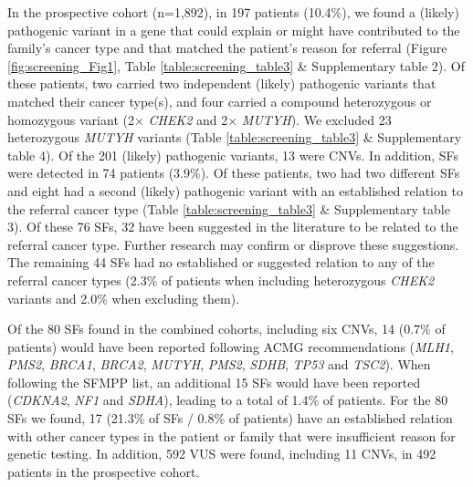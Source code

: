 In the prospective cohort (n=1,892), in 197 patients (10.4\%), we found a (likely) pathogenic variant in a gene that could explain or might have contributed to the family’s cancer type and that matched the patient’s reason for referral (Figure \ref{fig:screening_Fig1}, Table \ref{table:screening_table3} \& Supplementary table 2). %
Of these patients, two carried two independent (likely) pathogenic variants that matched their cancer type(s), and four carried a compound heterozygous or homozygous variant (2$\times$  \textsl{CHEK2} and 2$\times$  \textsl{MUTYH}). 
We excluded 23 heterozygous \textsl{MUTYH} variants (Table \ref{table:screening_table3} \& Supplementary table 4). %
Of the 201 (likely) pathogenic variants, 13 were CNVs. In addition, SFs were detected in 74 patients (3.9\%). 
Of these patients, two had two different SFs and eight had a second (likely) pathogenic variant with an established relation to the referral cancer type (Table \ref{table:screening_table3} \& Supplementary table 3). 
Of these 76 SFs, 32 have been suggested in the literature to be related to the referral cancer type. 
Further research may confirm or disprove these suggestions. The remaining 44 SFs had no established or suggested relation to any of the referral cancer types (2.3\% of patients when including heterozygous \textsl{CHEK2} variants and 2.0\% when excluding them). 

Of the 80 SFs found in the combined cohorts, including six CNVs, 14 (0.7\% of patients) would have been reported following ACMG recommendations (\textsl{MLH1}, \textsl{PMS2}, \textsl{BRCA1}, \textsl{BRCA2}, \textsl{MUTYH}, \textsl{PMS2}, \textsl{SDHB}, \textsl{TP53} and \textsl{TSC2}). 
When following the SFMPP list, an additional 15 SFs would have been reported (\textsl{CDKNA2}, \textsl{NF1} and \textsl{SDHA}), leading to a total of 1.4\% of patients. 
For the 80 SFs we found, 17 (21.3\% of SFs / 0.8\% of patients) have an established relation with other cancer types in the patient or family that were insufficient reason for genetic testing. 
In addition, 592 VUS were found, including 11 CNVs, in 492 patients in the prospective cohort.


